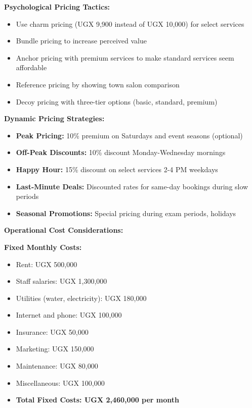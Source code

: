 \documentclass[a4paper,12pt]{article}
\begin{document}
\textbf{Psychological Pricing Tactics:}
\begin{itemize}[leftmargin=2em]
    \item Use charm pricing (UGX 9,900 instead of UGX 10,000) for select services
    \item Bundle pricing to increase perceived value
    \item Anchor pricing with premium services to make standard services seem affordable
    \item Reference pricing by showing town salon comparison
    \item Decoy pricing with three-tier options (basic, standard, premium)
\end{itemize}

\textbf{Dynamic Pricing Strategies:}
\begin{itemize}[leftmargin=2em]
    \item \textbf{Peak Pricing:} 10\% premium on Saturdays and event seasons (optional)
    \item \textbf{Off-Peak Discounts:} 10\% discount Monday-Wednesday mornings
    \item \textbf{Happy Hour:} 15\% discount on select services 2-4 PM weekdays
    \item \textbf{Last-Minute Deals:} Discounted rates for same-day bookings during slow periods
    \item \textbf{Seasonal Promotions:} Special pricing during exam periods, holidays
\end{itemize}

\vspace{1em}

\textbf{Operational Cost Considerations:}

\textbf{Fixed Monthly Costs:}
\begin{itemize}[leftmargin=2em]
    \item Rent: UGX 500,000
    \item Staff salaries: UGX 1,300,000
    \item Utilities (water, electricity): UGX 180,000
    \item Internet and phone: UGX 100,000
    \item Insurance: UGX 50,000
    \item Marketing: UGX 150,000
    \item Maintenance: UGX 80,000
    \item Miscellaneous: UGX 100,000
    \item \textbf{Total Fixed Costs: UGX 2,460,000 per month}
\end{itemize}
\end{document}
